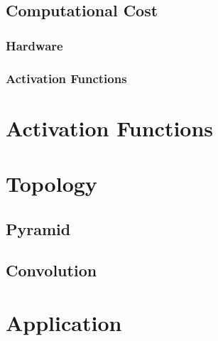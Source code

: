 \documentclass[conference]{IEEEtran}
\begin{document}
\subsection{Computational Cost}
\subsubsection{Hardware}

\subsubsection{Activation Functions}
\section{Activation Functions}
\section{Topology}

\subsection{Pyramid}
\subsection{Convolution}

\section{Application}



\end{document}
